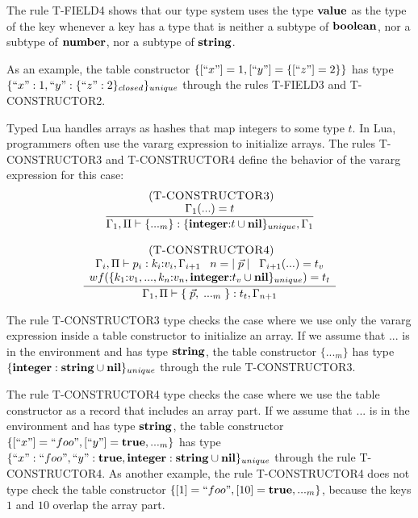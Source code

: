 The rule \textsc{T-FIELD4} shows that our type system uses the type $\mathbf{value}$
as the type of the key whenever a key has a type that is neither a
subtype of $\mathbf{boolean}$, nor a subtype of $\mathbf{number}$, nor a subtype of $\mathbf{string}$.

As an example, the table constructor $\{[``x"] = 1, [``y"] = \{[``z"] = 2\}\}$
has type $\{``x":1, ``y":\{``z":2\}_{closed}\}_{unique}$ through the rules
\textsc{T-FIELD3} and \textsc{T-CONSTRUCTOR2}.

Typed Lua handles arrays as hashes that map integers to some type $t$.
In Lua, programmers often use the vararg expression to initialize arrays.
The rules \textsc{T-CONSTRUCTOR3} and \textsc{T-CONSTRUCTOR4} define
the behavior of the vararg expression for this case:
\[
\begin{array}{c}
\begin{array}{c}
\; (\textsc{T-CONSTRUCTOR3})\\
\dfrac{\Gamma_{1}({...}) = t}
      {\Gamma_{1}, \Pi \vdash \{{...}_{m}\}:\{\mathbf{integer}{:}t \cup \mathbf{nil}\}_{unique}, \Gamma_{1}}
\end{array}
\\ \\
\begin{array}{c}
\; (\textsc{T-CONSTRUCTOR4})\\
\dfrac{\begin{array}{c}
       \Gamma_{i}, \Pi \vdash p_{i}:k_{i}{:}v_{i}, \Gamma_{i+1} \;\;\;
       n = |\;\vec{p}\;| \;\;\;
       \Gamma_{i+1}({...}) = t_{v}\\
       wf(\{k_{1}{:}v_{1}, ..., k_{n}{:}v_{n}, \mathbf{integer}{:}t_{v} \cup \mathbf{nil}\}_{unique}) = t_{t}
       \end{array}}
      {\Gamma_{1}, \Pi \vdash \{\;\vec{p},\;{...}_{m}\;\}:t_{t}, \Gamma_{n+1}}
\end{array}
\end{array}
\]

The rule \textsc{T-CONSTRUCTOR3} type checks the case where we use
only the vararg expression inside a table constructor to initialize
an array.
If we assume that $...$ is in the environment and has type $\mathbf{string}$,
the table constructor $\{{...}_{m}\}$ has type $\{\mathbf{integer}:\mathbf{string} \cup \mathbf{nil}\}_{unique}$
through the rule \textsc{T-CONSTRUCTOR3}.

The rule \textsc{T-CONSTRUCTOR4} type checks the case where we use
the table constructor as a record that includes an array part.
If we assume that $...$ is in the environment and has type $\mathbf{string}$,
the table constructor $\{[``x"] = ``foo", [``y"] = \mathbf{true}, {...}_{m}\}$
has type $\{``x":``foo", ``y":\mathbf{true}, \mathbf{integer}:\mathbf{string} \cup \mathbf{nil}\}_{unique}$
through the rule \textsc{T-CONSTRUCTOR4}.
As another example, the rule \textsc{T-CONSTRUCTOR4} does not type check
the table constructor $\{ [1] = ``foo", [10] = \mathbf{true}, {...}_{m} \}$,
because the keys $1$ and $10$ overlap the array part.


